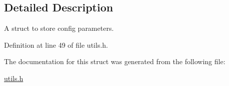 \subsection{Detailed Description}
A struct to store config parameters. 

Definition at line 49 of file utils.\-h.



The documentation for this struct was generated from the following file\-:\begin{DoxyCompactItemize}
\item 
\hyperlink{utils_8h}{utils.\-h}\end{DoxyCompactItemize}
